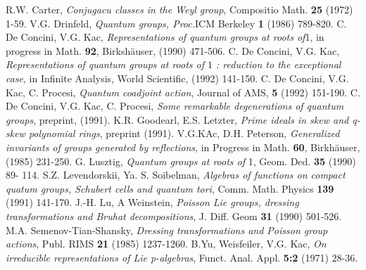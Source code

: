 \begin{thebibliography}{99}
 R.W. Carter, \textit{Conjugacu classes in the Weyl group}, Compositio Math. {\bf 25} (1972) 1-59.
 V.G. Drinfeld, \textit{Quantum groups, Proc.}ICM Berkeley {\bf 1} (1986) 789-820.
 C. De Concini, V.G. Kac, \textit{Representations of quantum groups at roots of}1, in progress in Math. {\bf 92}, Birksh\"auser, (1990) 471-506.
 C. De Concini, V.G. Kac, \textit{Representations of quantum groups at roots of $1$ : reduction to the exceptional case}, in Infinite Analysis, World Scientific, (1992) 141-150. 
C. De Concini, V.G. Kac, C. Procesi, \textit{Quantum coadjoint action}, Journal of AMS, {\bf 5} (1992) 151-190.
 C. De Concini, V.G. Kac, C. Procesi, \textit{Some remarkable degenerations of quantum groups}, preprint, (1991).
 K.R. Goodearl, E.S. Letzter, \textit{Prime ideals in skew and q-skew polynomial rings}, preprint (1991).
 V.G.KAc, D.H. Peterson, \textit{Generalized invariants of groups generated by reflections}, in Progress in Math. {\bf 60}, Birkh\"auser, (1985) 231-250.
G. Lusztig, \textit{Quantum groups at roots of} 1, Geom. Ded. {\bf 35} (1990) 89- 114.
 S.Z. Levendorskii, Ya. S. Soibelman, \textit{Algebras of functions on compact quatum groups, Schubert cells and quantum tori}, Comm. Math. Physics {\bf 139} (1991) 141-170.
J.-H. Lu, A Weinstein, \textit{Poisson Lie groups, dressing transformations and Bruhat decompositions}, J. Diff. Geom {\bf 31} (1990) 501-526.
 M.A. Semenov-Tian-Shansky, \textit{Dressing transformations and Poisson group actions}, Publ. RIMS {\bf 21} (1985) 1237-1260.
B.Yu, Weisfeiler, V.G. Kac, \textit{On irreducible representations of Lie p-algebras}, Funct. Anal. Appl. {\bf 5:2} (1971) 28-36.
\end{thebibliography}

